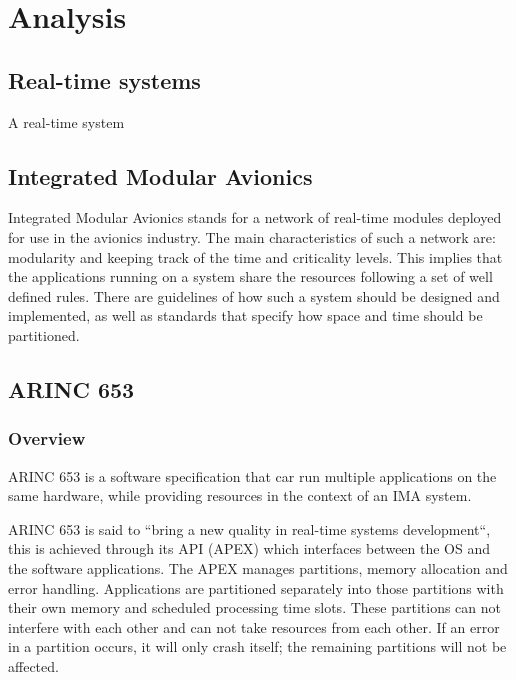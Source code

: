
\chapter{Analysis}


\section{Real-time systems}

A real-time system

\section{Integrated Modular Avionics}

Integrated Modular Avionics stands for a network of real-time modules deployed for use in the avionics industry. The main characteristics of such a network are: modularity and keeping track of the time and criticality levels. This implies that the applications running on a system share the resources following a set of well defined rules. There are guidelines of how such a system should be designed and implemented, as well as standards that specify how space and time should be partitioned.

\section{ARINC 653}
\subsection{Overview}

ARINC 653 is a software specification that car run multiple applications on the same hardware, while providing resources in the context of an IMA system.

ARINC 653 is said to “bring a new quality in real-time systems development“,
this is achieved through its API (APEX) which interfaces between the OS and the software applications.
The APEX manages partitions, memory allocation and error handling.
Applications are partitioned separately into those partitions with their own memory and scheduled processing time slots.
These partitions can not interfere with each other and can not take resources from each other.
If an error in a partition occurs, it will only crash itself; the remaining partitions will not be affected.

